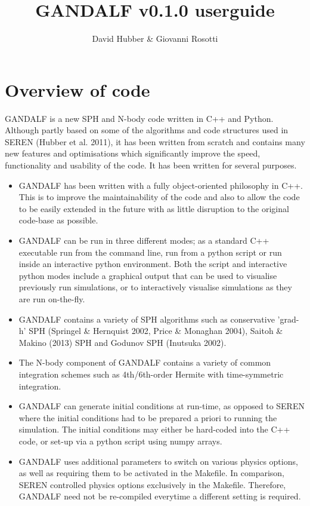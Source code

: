\documentclass[a4paper]{article}
\newcommand{\VERNO}{0.1.0 }
\begin{document}
\title{GANDALF v\VERNO userguide}
\author{David Hubber \& Giovanni Rosotti}

\maketitle
\tableofcontents

\newpage


\section{Overview of code}
GANDALF is a new SPH and N-body code written in C++ and Python.  Although partly based on some of the algorithms and code structures used in SEREN (Hubber et al. 2011), it has been written from scratch and contains many new features and optimisations which significantly improve the speed, functionality and usability of the code.  It has been written for several purposes.
\begin{itemize}
\item GANDALF has been written with a fully object-oriented philosophy in C++.  This is to improve the maintainability of the code and also to allow the code to be easily extended in the future with as little disruption to the original code-base as possible.
\item GANDALF can be run in three different modes; as a standard C++ executable run from the command line, run from a python script or run inside an interactive python environment.  Both the script and interactive python modes include a graphical output that can be used to visualise previously run simulations, or to interactively visualise simulations as they are run on-the-fly.
\item GANDALF contains a variety of SPH algorithms such as conservative 'grad-h' SPH (Springel \& Hernquist 2002, Price \& Monaghan 2004), Saitoh \& Makino (2013) SPH and Godunov SPH (Inutsuka 2002).
\item The N-body component of GANDALF contains a variety of common integration schemes such as 4th/6th-order Hermite with time-symmetric integration.
\item GANDALF can generate initial conditions at run-time, as opposed to SEREN where the initial conditions had to be prepared a priori to running the simulation.  The initial conditions may either be hard-coded into the C++ code, or set-up via a python script using numpy arrays.
\item GANDALF uses additional parameters to switch on various physics options, as well as requiring them to be activated in the Makefile.  In comparison, SEREN controlled physics options exclusively in the Makefile.  Therefore, GANDALF need not be re-compiled everytime a different setting is required.
\end{itemize}
\end{document}
